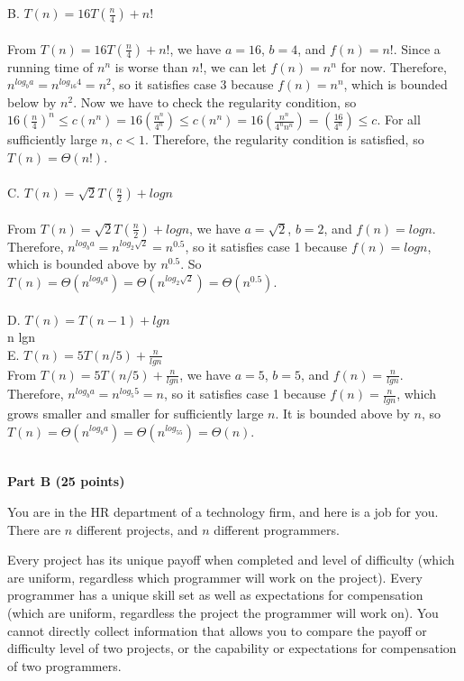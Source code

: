 \documentclass{article}
\begin{document}
\noindent B. $T(n) = 16 T(\frac{n}{4}) + n!$\\\\
From $T(n) = 16 T(\frac{n}{4}) + n!$, we have $a=16$, $b=4$, and $f(n)=n!$. Since a running time of $n^n$ is worse than $n!$, we can let $f(n)=n^n$ for now. Therefore, $n^{log_ba} = n^{log_{16}{4}} = n^2$, so it satisfies case 3 because $f(n) = n^n$, which is bounded below by $n^2$. Now we have to check the regularity condition, so $16 (\frac{n}{4})^n \leq c (n^{n}) = 16 (\frac{n^n}{4^n}) \leq c (n^{n}) = 16 (\frac{n^n}{4^nn^n}) = (\frac {16}{4^n}) \leq c$. For all sufficiently large $n$, $c < 1$. Therefore, the regularity condition is satisfied, so $T(n) = \Theta(n!)$.\\\\

\noindent C. $T(n) = \sqrt{2} T(\frac{n}{2}) + logn$\\\\
From $T(n) = \sqrt{2} T(\frac{n}{2}) + logn$, we have $a=\sqrt{2}$, $b=2$, and $f(n)=logn$. Therefore, $n^{log_ba} = n^{log_{2}{\sqrt{2}}} = n^{0.5}$, so it satisfies case 1 because $f(n) = logn$, which is bounded above by $n^{0.5}$. So $T(n) = \Theta(n^{log_ba}) = \Theta(n^{log_2\sqrt{2}}) = \Theta(n^{0.5})$.\\\\

\noindent D. $T(n) = T(n-1) + lgn$\\ n lgn\\
\noindent E. $T(n) = 5T(n/5) + \frac{n}{lgn}$\\
From $T(n) = 5T(n/5) + \frac{n}{lgn}$, we have $a=5$, $b=5$, and $f(n)=\frac{n}{lgn}$. Therefore, $n^{log_ba} = n^{log_{5}{5}} = n$, so it satisfies case 1 because $f(n)=\frac{n}{lgn}$, which grows smaller and smaller for sufficiently large $n$. It is bounded above by $n$, so $T(n) = \Theta(n^{log_ba}) = \Theta(n^{log_55}) = \Theta(n)$.\\\\

\begin{center}
{\bf Part B (25 points)}
\end{center}

 You are in the HR department of a
technology firm, and here is a job for you.  There are $n$ different
projects, and $n$ different programmers.

Every project has its unique payoff when completed and level of
difficulty (which are uniform, regardless which programmer will work
on the project).  Every programmer has a unique skill set as well as
expectations for compensation (which are uniform, regardless the
project the programmer will work on). You cannot directly collect
information that allows you to compare the payoff or difficulty level
of two projects, or the capability or expectations for compensation of
two programmers.
\end{document}
